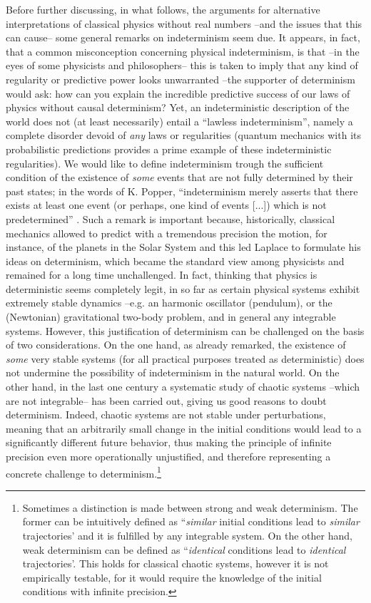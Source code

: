 \documentclass[aps,prl,twocolumn,showpacs,superscriptaddress,groupedaddress, nofootinbib]{revtex4-1}
\begin{document}
Before further discussing, in what follows, the arguments for alternative interpretations of classical physics without real numbers --and the issues that this can cause-- some general remarks on indeterminism seem due. It appears, in fact, that a common misconception concerning physical indeterminism, is that --in the eyes of some physicists and philosophers-- this is taken to imply that any kind of regularity or predictive power looks unwarranted --the supporter of determinism would ask: how can you explain the incredible predictive success of our laws of physics without causal determinism? Yet, an indeterministic description of the world does not (at least necessarily) entail a ``lawless indeterminism'', namely a complete disorder devoid of \emph{any} laws or regularities (quantum mechanics with its probabilistic predictions provides a prime example of these indeterministic regularities). We would like to define indeterminism trough the sufficient condition of the existence of \emph{some} events that are not fully determined by their past states; in the words of K. Popper, ``indeterminism merely asserts that there exists at least one event (or perhaps, one kind of events [...]) which is not predetermined'' \cite{popper50}. Such a remark is important because, historically, classical mechanics allowed to predict with a tremendous precision the motion, for instance, of the planets in the Solar System and this led Laplace to formulate his ideas on determinism, which became the standard view among physicists and remained for a long time unchallenged. In fact, thinking that physics is deterministic seems completely legit, in so far as certain physical systems exhibit extremely stable dynamics --e.g. an harmonic oscillator (pendulum), or the (Newtonian) gravitational two-body problem, and in general any integrable systems.  However, this justification of determinism can be challenged on the basis of two considerations. On the one hand, as already remarked, the existence of \emph{some} very stable systems (for all practical purposes treated as deterministic) does not undermine the possibility of indeterminism in the natural world. On the other hand, in the last one century a systematic study of chaotic systems --which are not integrable-- has been carried out, giving us good reasons to doubt determinism. Indeed, chaotic systems are not stable under perturbations, meaning that an arbitrarily small change in the initial conditions would lead to a significantly different future behavior, thus making the principle of infinite precision even more operationally unjustified, and therefore representing a concrete challenge to determinism.\footnote{Sometimes a distinction is made between strong and weak determinism. The former can be intuitively defined as ``\emph{similar} initial conditions lead to \emph{similar} trajectories’ and it is fulfilled by any integrable system. On the other hand, weak determinism can be defined as ``\emph{identical} conditions lead to \emph{identical} trajectories’. This holds for classical chaotic systems, however it is not empirically testable, for it would require the knowledge of the initial conditions with infinite precision.}
\end{document}

